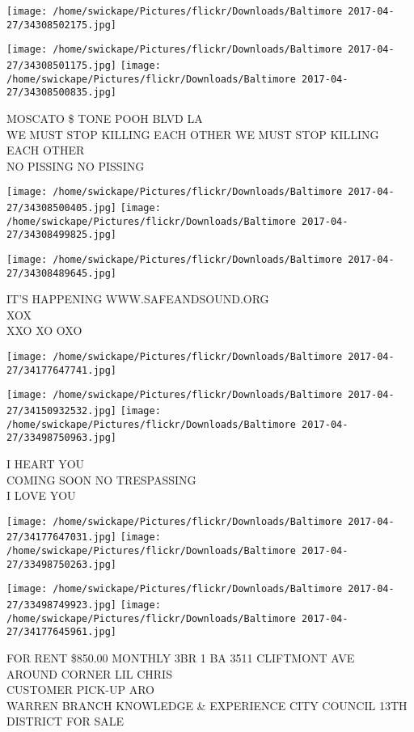 \documentclass[10pt,letterpaper]{article}
\begin{document}
\texttt{[image: /home/swickape/Pictures/flickr/Downloads/Baltimore 2017-04-27/34308502175.jpg]}

\vspace{0.25in}
\texttt{[image: /home/swickape/Pictures/flickr/Downloads/Baltimore 2017-04-27/34308501175.jpg]}
\texttt{[image: /home/swickape/Pictures/flickr/Downloads/Baltimore 2017-04-27/34308500835.jpg]}

MOSCATO \$ TONE POOH BLVD LA\\
WE MUST STOP KILLING EACH OTHER WE MUST STOP KILLING EACH OTHER\\
NO PISSING NO PISSING
\pagebreak

\texttt{[image: /home/swickape/Pictures/flickr/Downloads/Baltimore 2017-04-27/34308500405.jpg]}
\texttt{[image: /home/swickape/Pictures/flickr/Downloads/Baltimore 2017-04-27/34308499825.jpg]}

\texttt{[image: /home/swickape/Pictures/flickr/Downloads/Baltimore 2017-04-27/34308489645.jpg]}

IT'S HAPPENING WWW.SAFEANDSOUND.ORG\\
XOX\\
XXO XO OXO
\pagebreak

\texttt{[image: /home/swickape/Pictures/flickr/Downloads/Baltimore 2017-04-27/34177647741.jpg]}

\vspace{0.25in}
\texttt{[image: /home/swickape/Pictures/flickr/Downloads/Baltimore 2017-04-27/34150932532.jpg]}
\texttt{[image: /home/swickape/Pictures/flickr/Downloads/Baltimore 2017-04-27/33498750963.jpg]}

I HEART YOU\\
COMING SOON NO TRESPASSING\\
I LOVE YOU
\pagebreak

\texttt{[image: /home/swickape/Pictures/flickr/Downloads/Baltimore 2017-04-27/34177647031.jpg]}
\texttt{[image: /home/swickape/Pictures/flickr/Downloads/Baltimore 2017-04-27/33498750263.jpg]}

\texttt{[image: /home/swickape/Pictures/flickr/Downloads/Baltimore 2017-04-27/33498749923.jpg]}
\texttt{[image: /home/swickape/Pictures/flickr/Downloads/Baltimore 2017-04-27/34177645961.jpg]}

FOR RENT \$850.00 MONTHLY 3BR 1 BA 3511 CLIFTMONT AVE\\
AROUND CORNER LIL CHRIS\\
CUSTOMER PICK{-}UP ARO\\
WARREN BRANCH KNOWLEDGE \& EXPERIENCE CITY COUNCIL 13TH DISTRICT FOR SALE
\pagebreak
\end{document}
